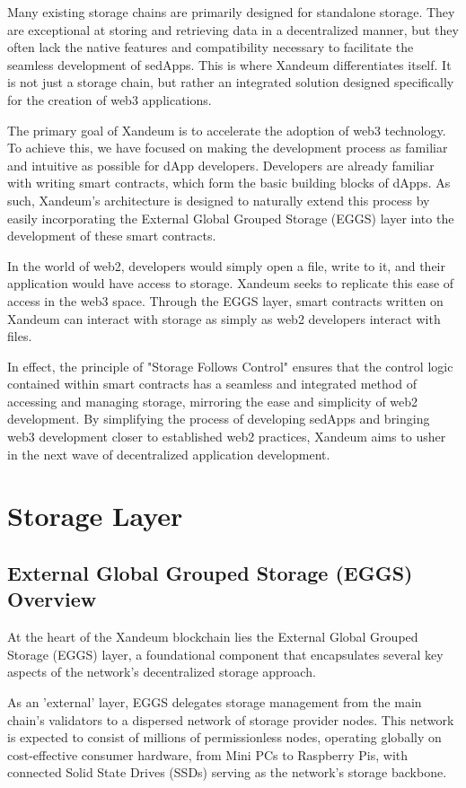 \documentclass[11 pt]{article}   	%
\let\oldsection\section
\renewcommand{\section}{\clearpage\oldsection}
\begin{document}
Many existing storage chains are primarily designed for standalone storage. They are exceptional at storing and retrieving data in a decentralized manner, but they often lack the native features and compatibility necessary to facilitate the seamless development of sedApps. This is where Xandeum differentiates itself. It is not just a storage chain, but rather an integrated solution designed specifically for the creation of web3 applications.

The primary goal of Xandeum is to accelerate the adoption of web3 technology. To achieve this, we have focused on making the development process as familiar and intuitive as possible for dApp developers. Developers are already familiar with writing smart contracts, which form the basic building blocks of dApps. As such, Xandeum's architecture is designed to naturally extend this process by easily incorporating the External Global Grouped Storage (EGGS) layer into the development of these smart contracts.

In the world of web2, developers would simply open a file, write to it, and their application would have access to storage. Xandeum seeks to replicate this ease of access in the web3 space. Through the EGGS layer, smart contracts written on Xandeum can interact with storage as simply as web2 developers interact with files.

In effect, the principle of "Storage Follows Control" ensures that the control logic contained within smart contracts has a seamless and integrated method of accessing and managing storage, mirroring the ease and simplicity of web2 development. By simplifying the process of developing sedApps and bringing web3 development closer to established web2 practices, Xandeum aims to usher in the next wave of decentralized application development.

\section{Storage Layer}
\subsection{External Global Grouped Storage (EGGS) Overview}
At the heart of the Xandeum blockchain lies the External Global Grouped Storage (EGGS) layer, a foundational component that encapsulates several key aspects of the network's decentralized storage approach.

As an 'external' layer, EGGS delegates storage management from the main chain's validators to a dispersed network of storage provider nodes. This network is expected to consist of millions of permissionless nodes, operating globally on cost-effective consumer hardware, from Mini PCs to Raspberry Pis, with connected Solid State Drives (SSDs) serving as the network's storage backbone.
\end{document}
